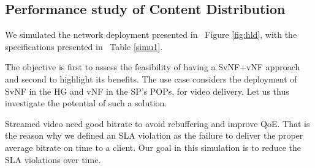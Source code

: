 \subsection{Performance study of Content Distribution} \label{videodelivery}
\begin{table}
	\caption{Hypothesis used for simulation\label{simu1}}
\end{table}
We simulated the network deployment presented in ~Figure \ref{fig:hld}, with the specifications presented in ~Table \ref{simu1}.

The objective is first to assess the feasibility of having a SvNF+vNF approach and second to highlight its benefits. 
The use case considers the deployment of SvNF in the HG and vNF in the SP's POPs, for video delivery.
Let us thus investigate the potential of such a solution.

Streamed video need good bitrate to avoid rebuffering and improve QoE. That is the reason why we defined an SLA violation as the failure to deliver the proper average bitrate on time to a client. Our goal in this simulation is to reduce the SLA violations over time.

